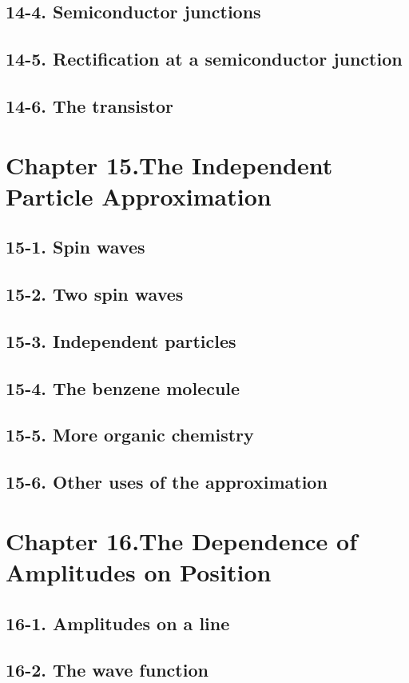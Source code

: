 \documentclass{article}
\begin{document}
\subsection{14-4. Semiconductor junctions}
\subsection{14-5. Rectification at a semiconductor junction}
\subsection{14-6. The transistor}
\section{Chapter 15.The Independent Particle Approximation}
\subsection{15-1. Spin waves}
\subsection{15-2. Two spin waves}
\subsection{15-3. Independent particles}
\subsection{15-4. The benzene molecule}
\subsection{15-5. More organic chemistry}
\subsection{15-6. Other uses of the approximation}
\section{Chapter 16.The Dependence of Amplitudes on Position}
\subsection{16-1. Amplitudes on a line}
\subsection{16-2. The wave function}
\end{document}
